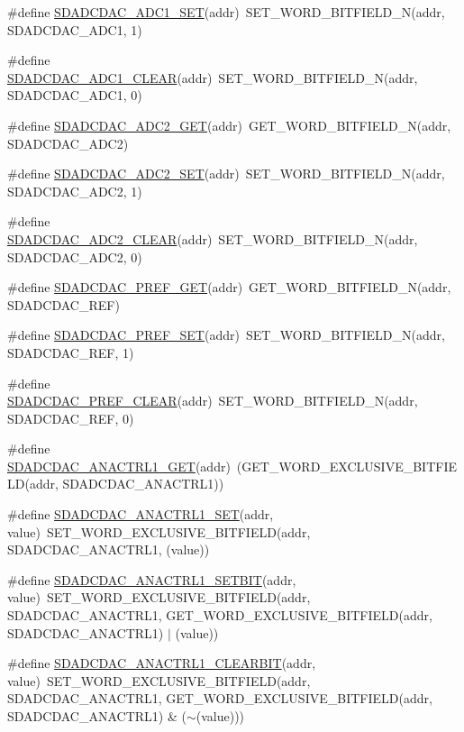 \begin{DoxyCompactItemize}
\item 
\#define \hyperlink{a00568_a33ff385381d748fee474095647e67bd3}{SDADCDAC\_\-ADC1\_\-SET}(addr)~SET\_\-WORD\_\-BITFIELD\_\-N(addr, SDADCDAC\_\-ADC1, 1)
\item 
\#define \hyperlink{a00568_a706718a6256279808b4d05f9e62a0ec4}{SDADCDAC\_\-ADC1\_\-CLEAR}(addr)~SET\_\-WORD\_\-BITFIELD\_\-N(addr, SDADCDAC\_\-ADC1, 0)
\item 
\#define \hyperlink{a00568_aedfef3d4890bd9c5d13ab6100d18a575}{SDADCDAC\_\-ADC2\_\-GET}(addr)~GET\_\-WORD\_\-BITFIELD\_\-N(addr, SDADCDAC\_\-ADC2)
\item 
\#define \hyperlink{a00568_af1eaf2e448987de5c2255103dd0caf85}{SDADCDAC\_\-ADC2\_\-SET}(addr)~SET\_\-WORD\_\-BITFIELD\_\-N(addr, SDADCDAC\_\-ADC2, 1)
\item 
\#define \hyperlink{a00568_a5c74ae2dd1f2193c0955ff50e7ad2ccf}{SDADCDAC\_\-ADC2\_\-CLEAR}(addr)~SET\_\-WORD\_\-BITFIELD\_\-N(addr, SDADCDAC\_\-ADC2, 0)
\item 
\#define \hyperlink{a00568_a418d16b80b5a7500783d90c36de12c02}{SDADCDAC\_\-PREF\_\-GET}(addr)~GET\_\-WORD\_\-BITFIELD\_\-N(addr, SDADCDAC\_\-REF)
\item 
\#define \hyperlink{a00568_a844581b4378fcd6fb310091c450249f3}{SDADCDAC\_\-PREF\_\-SET}(addr)~SET\_\-WORD\_\-BITFIELD\_\-N(addr, SDADCDAC\_\-REF, 1)
\item 
\#define \hyperlink{a00568_ac8cf4f7e7fc02859f3d06fb04755746e}{SDADCDAC\_\-PREF\_\-CLEAR}(addr)~SET\_\-WORD\_\-BITFIELD\_\-N(addr, SDADCDAC\_\-REF, 0)
\item 
\#define \hyperlink{a00568_a6b7c85301cf1ff407f038e9d43b6fa2a}{SDADCDAC\_\-ANACTRL1\_\-GET}(addr)~(GET\_\-WORD\_\-EXCLUSIVE\_\-BITFIELD(addr, SDADCDAC\_\-ANACTRL1))
\item 
\#define \hyperlink{a00568_aa4da160defcc2a1284caaf67f3fa4391}{SDADCDAC\_\-ANACTRL1\_\-SET}(addr, value)~SET\_\-WORD\_\-EXCLUSIVE\_\-BITFIELD(addr, SDADCDAC\_\-ANACTRL1, (value))
\item 
\#define \hyperlink{a00568_a9a0e5106f63484f55d979bf0a7a5b65b}{SDADCDAC\_\-ANACTRL1\_\-SETBIT}(addr, value)~SET\_\-WORD\_\-EXCLUSIVE\_\-BITFIELD(addr, SDADCDAC\_\-ANACTRL1, GET\_\-WORD\_\-EXCLUSIVE\_\-BITFIELD(addr, SDADCDAC\_\-ANACTRL1) $|$ (value))
\item 
\#define \hyperlink{a00568_a1cb58b697c31a3889196cddfeb60d024}{SDADCDAC\_\-ANACTRL1\_\-CLEARBIT}(addr, value)~SET\_\-WORD\_\-EXCLUSIVE\_\-BITFIELD(addr, SDADCDAC\_\-ANACTRL1, GET\_\-WORD\_\-EXCLUSIVE\_\-BITFIELD(addr, SDADCDAC\_\-ANACTRL1) \& ($\sim$(value)))

\end{DoxyCompactItemize}
